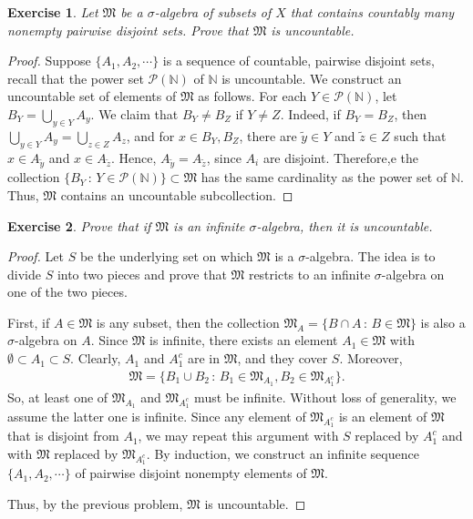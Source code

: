 \documentclass[11pt]{book}
\newtheorem{exercise}{Exercise}[section]
\theoremstyle{definition}
\numberwithin{equation}{chapter}
\def\MM{\mathfrak{M}}
\begin{document}
\medskip

\begin{exercise}\label{exe_129}
Let $\MM$ be a $\sigma$-algebra of subsets of $X$ that contains countably many nonempty pairwise disjoint sets. Prove that $\MM$ is uncountable.
\end{exercise}
\begin{proof}
Suppose $\{A_1, A_2, \cdots\}$ is a sequence of countable, pairwise disjoint sets, recall that the power set $\mathcal{P}(\mathbb{N})$ of $\mathbb{N}$ is uncountable. We construct an uncountable set of elements of $\mathfrak{M}$ as follows. For each $Y \in \mathcal{P}(\mathbb{N})$, let $B_Y = \bigcup_{y\in Y} A_y$. We claim that $B_Y \neq B_Z$ if $Y \neq Z$. Indeed, if $B_Y = B_Z$, then $\bigcup_{y\in Y} A_y = \bigcup_{z\in Z} A_z$, and for $x \in B_Y, B_Z$, there are $\widetilde{y} \in Y$ and $\widetilde{z} \in Z$ such that $x \in A_{\widetilde{y}}$ and $x \in A_{\widetilde{z}}$. Hence, $A_{\widetilde{y}} = A_{\widetilde{z}}$, since $A_i$ are disjoint. Therefore,e the collection $\{B_Y \,:\, Y \in \mathcal{P}(\mathbb{N})\} \subset \mathfrak{M}$ has the same cardinality as the power set of $\mathbb{N}$. Thus, $\mathfrak{M}$ contains an uncountable subcollection.
\end{proof}

\medskip

\begin{exercise}\label{exe_130}
Prove that if $\MM$ is an infinite $\sigma$-algebra, then it is uncountable.
\end{exercise}
\begin{proof}
Let $S$ be the underlying set on which $\mathfrak{M}$ is a $\sigma$-algebra. The idea is to divide $S$ into two pieces and prove that $\mathfrak{M}$ restricts to an infinite $\sigma$-algebra on one of the two pieces. 

First, if $A \in \mathfrak{M}$ is any subset, then the collection $\mathfrak{M}_A = \{B \cap A \,:\, B \in \mathfrak{M}\}$ is also a $\sigma$-algebra on $A$. Since $\mathfrak{M}$ is infinite, there exists an element $A_1 \in \mathfrak{M}$ with $\emptyset \subset A_1 \subset S$. Clearly, $A_1$ and $A_1^c$ are in $\mathfrak{M}$, and they cover $S$. Moreover,
\begin{align*}
    \mathfrak{M} = \{B_1 \cup B_2 \,:\, B_1 \in \mathfrak{M}_{A_1}, B_2 \in \mathfrak{M}_{A_1^c} \}.
\end{align*}
So, at least one of $\mathfrak{M}_{A_1}$ and $\mathfrak{M}_{A_1^c}$ must be infinite. Without loss of generality, we assume the latter one is infinite. Since any element of $\mathfrak{M}_{A_1^c}$ is an element of $\mathfrak{M}$ that is disjoint from $A_1$, we may repeat this argument with $S$ replaced by $A_1^c$ and with $\mathfrak{M}$ replaced by $\mathfrak{M}_{A_1^c}$. By induction, we construct an infinite sequence $\{A_1, A_2, \cdots\}$ of pairwise disjoint nonempty elements of $\mathfrak{M}$.

Thus, by the previous problem, $\mathfrak{M}$ is uncountable.
\end{proof}
\end{document}
